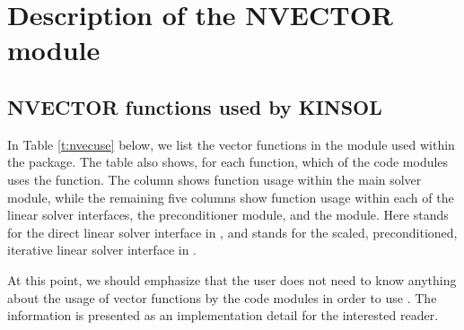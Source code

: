 \chapter{Description of the NVECTOR module}\label{s:nvector}



\section{NVECTOR functions used by KINSOL}

In Table \ref{t:nvecuse} below, we list the vector functions in the 
{\nvector} module used within the {\kinsol} package.
The table also shows, for each function, which of the code modules uses
the function. The {\kinsol} column shows function usage within the main
solver module, while the remaining five columns show function
usage within each of the {\kinsol} linear solver interfaces, 
the {\kinbbdpre} preconditioner module, and the {\fkinsol} module.
Here {\kindls} stands for the direct linear solver interface in {\kinsol}, and
{\kinspils} stands for the scaled, preconditioned, iterative linear
solver interface in {\kinsol}.

At this point, we should emphasize that the {\kinsol} user does not need to know 
anything about the usage of vector functions by the {\kinsol} code modules in order 
to use {\kinsol}. The information is presented as an implementation detail for the 
interested reader.

